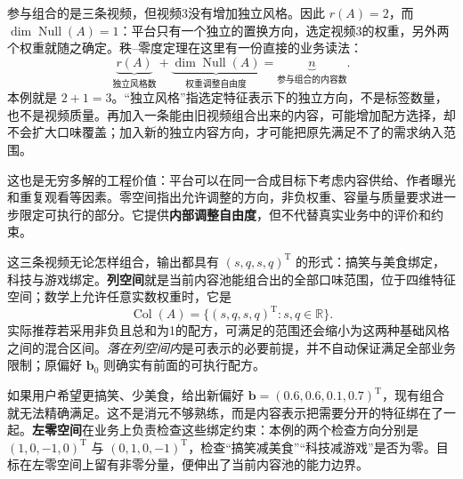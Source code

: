 \documentclass[a4paper,12pt,twoside,openany,fontset=none]{ctexbook}
\numberwithin{equation}{chapter}
\begin{document}
参与组合的是三条视频，但视频3没有增加独立风格。因此 $r(A)=2$，而 $\dim\operatorname{Null}(A)=1$：平台只有一个独立的置换方向，选定视频3的权重，另外两个权重就随之确定。秩--零度定理在这里有一份直接的业务读法：
\begin{equation}
 \underbrace{r(A)}_{\text{独立风格数}}
 +\underbrace{\dim\operatorname{Null}(A)}_{\text{权重调整自由度}}
 =\underbrace{n}_{\text{参与组合的内容数}}.
 \label{eq:five-rec-rank-nullity}
\end{equation}
本例就是 $2+1=3$。“独立风格”指选定特征表示下的独立方向，不是标签数量，也不是视频质量。再加入一条能由旧视频组合出来的内容，可能增加配方选择，却不会扩大口味覆盖；加入新的独立内容方向，才可能把原先满足不了的需求纳入范围。

这也是无穷多解的工程价值：平台可以在同一合成目标下考虑内容供给、作者曝光和重复观看等因素。零空间指出允许调整的方向，非负权重、容量与质量要求进一步限定可执行的部分。它提供\textbf{内部调整自由度}，但不代替真实业务中的评价和约束。

这三条视频无论怎样组合，输出都具有 $(s,q,s,q)^{\mathrm T}$ 的形式：搞笑与美食绑定，科技与游戏绑定。\textbf{列空间}就是当前内容池能组合出的全部口味范围，位于四维特征空间；数学上允许任意实数权重时，它是
\begin{equation}
 \operatorname{Col}(A)=\{(s,q,s,q)^{\mathrm T}:s,q\in\mathbb R\}.
 \label{eq:five-rec-output-spaces}
\end{equation}
实际推荐若采用非负且总和为1的配方，可满足的范围还会缩小为这两种基础风格之间的混合区间。\emph{落在列空间内}是可表示的必要前提，并不自动保证满足全部业务限制；原偏好 $\boldsymbol b_0$ 则确实有前面的可执行配方。

如果用户希望更搞笑、少美食，给出新偏好 $\boldsymbol b=(0.6,0.6,0.1,0.7)^{\mathrm T}$，现有组合就无法精确满足。这不是消元不够熟练，而是内容表示把需要分开的特征绑在了一起。\textbf{左零空间}在业务上负责检查这些绑定约束：本例的两个检查方向分别是 $(1,0,-1,0)^{\mathrm T}$ 与 $(0,1,0,-1)^{\mathrm T}$，检查“搞笑减美食”“科技减游戏”是否为零。目标在左零空间上留有非零分量，便伸出了当前内容池的能力边界。
\end{document}
